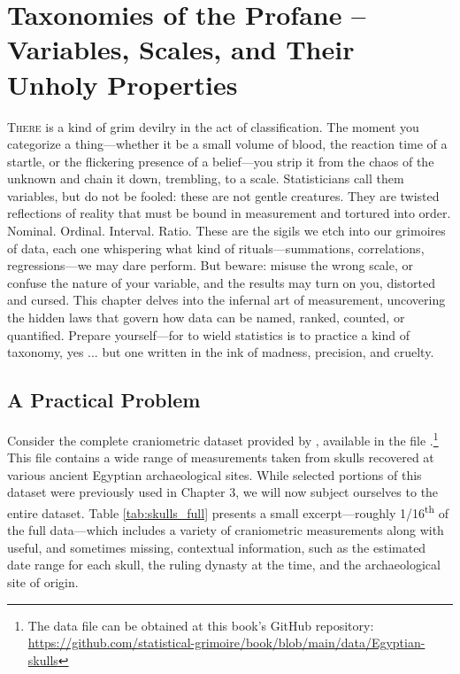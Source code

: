\chapter{Taxonomies of the Profane – Variables, Scales, and Their Unholy Properties}

\IMFellEnglish
\lettrine[lines=5, realheight]{T}{here} is a kind of grim devilry in the act of classification. The moment you categorize a thing—whether it be a small volume of blood, the reaction time of a startle, or the flickering presence of a belief—you strip it from the chaos of the unknown and chain it down, trembling, to a scale. Statisticians call them variables, but do not be fooled: these are not gentle creatures. They are twisted reflections of reality that must be bound in measurement and tortured into order. Nominal. Ordinal. Interval. Ratio. These are the sigils we etch into our grimoires of data, each one whispering what kind of rituals—summations, correlations, regressions—we may dare perform. But beware: misuse the wrong scale, or confuse the nature of your variable, and the results may turn on you, distorted and cursed. This chapter delves into the infernal art of measurement, uncovering the hidden laws that govern how data can be named, ranked, counted, or quantified. Prepare yourself—for to wield statistics is to practice a kind of taxonomy, yes  ... but one written in the ink of madness, precision, and cruelty.

\normalfont

\section{A Practical Problem}

Consider the complete craniometric dataset provided by  \textcite{Thomson1905}, available in the file .\footnote{The data file can be obtained at this book's GitHub repository: \url{https://github.com/statistical-grimoire/book/blob/main/data/Egyptian-skulls}} This file contains a wide range of measurements taken from skulls recovered at various ancient Egyptian archaeological sites. While selected portions of this dataset were previously used in Chapter 3, we will now subject ourselves to the entire dataset. Table \ref{tab:skulls_full} presents a small excerpt—roughly 1/16\textsuperscript{th} of the full data—which includes a variety of craniometric measurements along with useful, and sometimes missing, contextual information, such as the estimated date range for each skull, the ruling dynasty at the time, and the archaeological site of origin.

